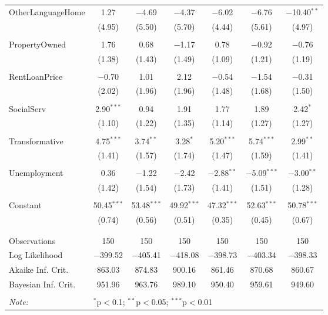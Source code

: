 \documentclass[openany]{book}
\begin{document}
\begin{table}[!htbp]
\begin{tabular}{@{\extracolsep{1pt}}lcccccc}
 OtherLanguageHome & 1.27 & $-$4.69 & $-$4.37 & $-$6.02 & $-$6.76 & $-$10.40$^{**}$ \\ 
  & (4.95) & (5.50) & (5.70) & (4.44) & (5.61) & (4.97) \\ 
  & & & & & & \\ 
 PropertyOwned & 1.76 & 0.68 & $-$1.17 & 0.78 & $-$0.92 & $-$0.76 \\ 
  & (1.38) & (1.43) & (1.49) & (1.09) & (1.21) & (1.19) \\ 
  & & & & & & \\ 
 RentLoanPrice & $-$0.70 & 1.01 & 2.12 & $-$0.54 & $-$1.54 & $-$0.31 \\ 
  & (2.02) & (1.96) & (1.96) & (1.48) & (1.68) & (1.50) \\ 
  & & & & & & \\ 
 SocialServ & 2.90$^{***}$ & 0.94 & 1.91 & 1.77 & 1.89 & 2.42$^{*}$ \\ 
  & (1.10) & (1.22) & (1.35) & (1.14) & (1.27) & (1.27) \\ 
  & & & & & & \\ 
 Transformative & 4.75$^{***}$ & 3.74$^{**}$ & 3.28$^{*}$ & 5.20$^{***}$ & 5.74$^{***}$ & 2.99$^{**}$ \\ 
  & (1.41) & (1.57) & (1.74) & (1.47) & (1.59) & (1.41) \\ 
  & & & & & & \\ 
 Unemployment & 0.36 & $-$1.22 & $-$2.42 & $-$2.88$^{**}$ & $-$5.09$^{***}$ & $-$3.00$^{**}$ \\ 
  & (1.42) & (1.54) & (1.73) & (1.41) & (1.51) & (1.28) \\ 
  & & & & & & \\ 
 Constant & 50.45$^{***}$ & 53.48$^{***}$ & 49.92$^{***}$ & 47.32$^{***}$ & 52.63$^{***}$ & 50.78$^{***}$ \\ 
  & (0.74) & (0.56) & (0.51) & (0.35) & (0.45) & (0.67) \\ 
  & & & & & & \\ 
\hline \\[-1.8ex] 
Observations & 150 & 150 & 150 & 150 & 150 & 150 \\ 
Log Likelihood & $-$399.52 & $-$405.41 & $-$418.08 & $-$398.73 & $-$403.34 & $-$398.33 \\ 
Akaike Inf. Crit. & 863.03 & 874.83 & 900.16 & 861.46 & 870.68 & 860.67 \\ 
Bayesian Inf. Crit. & 951.96 & 963.76 & 989.10 & 950.40 & 959.61 & 949.60 \\ 
\hline 
\hline \\[-1.8ex] 
\textit{Note:}  & \multicolumn{6}{l}{$^{*}$p$<$0.1; $^{**}$p$<$0.05; $^{***}$p$<$0.01} \\ 

\end{tabular}
\end{table}
\end{document}
